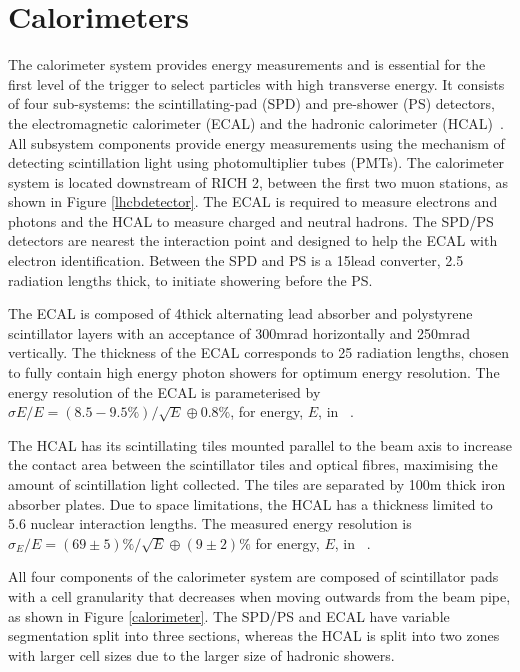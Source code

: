\section{Calorimeters}

The \lhcb calorimeter system provides energy measurements and is essential for the first level of the trigger to select particles with high transverse energy. It consists of four sub-systems: the scintillating-pad (SPD) and pre-shower (PS) detectors, the electromagnetic calorimeter (ECAL) and the hadronic calorimeter (HCAL)~\cite{LHCb-DP-2013-004}. All subsystem components provide energy measurements using the mechanism of detecting scintillation light using photomultiplier tubes (PMTs). The calorimeter system is located downstream of RICH 2, between the first two muon stations, as shown in Figure \ref{lhcbdetector}. The ECAL is required to measure electrons and photons and the HCAL to measure charged and neutral hadrons.  The SPD/PS detectors are nearest the interaction point and designed to help the ECAL with electron identification. Between the SPD and PS is a 15\mm lead converter, 2.5 radiation lengths thick, to initiate showering before the PS. 

The ECAL is composed of 4\mm thick alternating lead absorber and polystyrene scintillator layers with an acceptance of 300mrad horizontally and 250mrad vertically. The thickness of the ECAL corresponds to 25 radiation lengths, chosen to fully contain high energy photon showers for optimum energy resolution. The energy resolution of the ECAL is parameterised by $\sigma E/E = (8.5-9.5\%)/\sqrt{E} \oplus 0.8\%$, for energy, $E$, in \gev~\cite{calo_latest}.

The HCAL has its scintillating tiles mounted parallel to the beam axis to increase the contact area between the scintillator tiles and optical fibres, maximising the amount of scintillation light collected. The tiles are separated by 100m thick iron absorber plates. Due to space limitations, the HCAL has a thickness limited to 5.6 nuclear interaction lengths. The measured energy resolution is $\sigma_E/E = (69 \pm 5)\%/\sqrt{E} \oplus (9 \pm 2)\%$ for energy, $E$, in \gev~\cite{calo_latest}.

All four components of the calorimeter system are composed of scintillator pads with a cell granularity that decreases when moving outwards from the beam pipe, as shown in Figure \ref{calorimeter}. The SPD/PS and ECAL have variable segmentation split into three sections, whereas the HCAL is split into two zones with larger cell sizes due to the larger size of hadronic showers.

